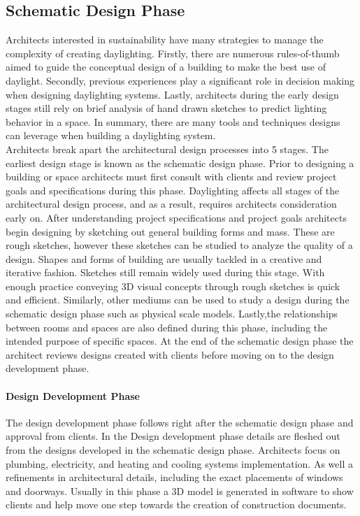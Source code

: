   \subsection{Schematic Design Phase}
    Architects interested in sustainability have many strategies to manage the complexity of creating daylighting.
    Firstly, there are numerous rules-of-thumb aimed to guide the conceptual design of a building to make the best use of daylight.
    Secondly, previous experiences play a significant role in decision making when designing daylighting systems. Lastly, architects during the early design stages still rely on brief analysis of hand drawn sketches to predict lighting behavior in a space. In summary, there are many tools and techniques designs can leverage when building a daylighting system.\\


  Architects break apart the architectural design processes into 5 stages. 
  The earliest design stage is known as the schematic design phase.
  Prior to designing a building or space architects must first consult with clients and review project goals and specifications during this phase.
  Daylighting affects all stages of the architectural design process, and as a result, requires architects consideration early on.
  After understanding project specifications and project goals architects begin designing by sketching out general building forms and mass. These are rough sketches, however these sketches can be studied to analyze the quality of a design. Shapes and forms of building are usually tackled in a creative and iterative fashion. Sketches still remain widely used during this stage. With enough practice conveying 3D visual concepts through rough sketches is quick and efficient.
  Similarly, other mediums can be used to study a design during the schematic design phase such as physical scale models.
  Lastly,the relationships between rooms and spaces are also defined during this phase, including the intended purpose of specific spaces.
  At the end of the schematic design phase the architect reviews designs created with clients before moving on to the design development phase.

  \paragraph{Design Development Phase} 
  The design development phase follows right after the schematic design phase and approval from clients.
  In the Design development phase details are fleshed out from the designs developed in the schematic design phase.
  Architects focus on plumbing, electricity, and heating and cooling systems implementation.
  As well a refinements in architectural details, including the exact placements of windows and doorways.
  Usually in this phase a 3D model is generated in software to show clients and help move one step towards the creation of construction documents.

